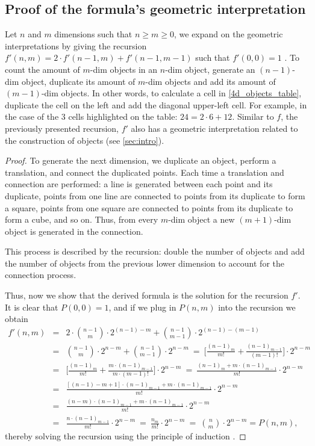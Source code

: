 \documentclass{article}
\begin{document}
	
	\subsection{Proof of the formula's geometric interpretation}
	
	Let $n$ and $m$ dimensions such that $n \geq m \geq 0$, we expand on the geometric interpretations by giving the recursion $f'(n,m) = 2 \cdot f'(n-1, m) + f'(n-1, m-1)$ such that $f'(0,0) = 1$ \cite{coxeter1973regular}. To count the amount of $m$-dim objects in an $n$-dim object, generate an $(n-1)$-dim object, duplicate its amount of $m$-dim objects and add its amount of $(m-1)$-dim objects. In other words, to calculate a cell in \autoref{4d_objects_table}, duplicate the cell on the left and add the diagonal upper-left cell. For example, in the case of the 3 cells highlighted on the table: $24 = 2 \cdot 6 + 12$. Similar to $f$, the previously presented recursion, $f'$ also has a geometric interpretation related to the construction of objects (see \autoref{sec:intro}).
	
	\begin{proof}
		To generate the next dimension, we duplicate an object, perform a translation, and connect the duplicated points. Each time a translation and connection are performed: a line is generated between each point and its duplicate, points from one line are connected to points from its duplicate to form a square, points from one square are connected to points from its duplicate to form a cube, and so on. Thus, from every $m$-dim object a new $(m+1)$-dim object is generated in the connection.
		
		This process is described by the recursion: double the number of objects and add the number of objects from the previous lower dimension to account for the connection process. 
		
		Thus, now we show that the derived formula is the solution for the recursion $f'$. It is clear that $P(0,0) = 1$, and if we plug in $P(n,m)$ into the recursion we obtain
		\begin{eqnarray*}
			f'(n,m) & = & 2 \cdot \binom{n-1}{m} \cdot 2^{(n-1)-m} + \binom{n-1}{m-1} \cdot 2^{(n-1)-(m-1)}\\
			& = & \binom{n-1}{m} \cdot 2^{n-m} + \binom{n-1}{m-1} \cdot 2^{n-m} \ = \ \Big[\frac{(n-1)_{m}}{m!} + \frac{(n-1)_{m-1}}{(m-1)!} \Big] \cdot 2^{n-m}\\
			& = & \Bigg[\frac{(n-1)_{m}}{m!} + \frac{m \cdot (n-1)_{m-1}}{m \cdot (m-1)!} \Bigg] \cdot 2^{n-m} \ = \ \frac{(n-1)_{m} + m \cdot (n-1)_{m-1}}{m!} \cdot 2^{n-m}\\
			& = & \frac{[(n-1) - m + 1] \cdot (n-1)_{m-1} + m \cdot (n-1)_{m-1}}{m!} \cdot 2^{n-m}\\
			& = & \frac{(n- m) \cdot (n-1)_{m-1} + m \cdot (n-1)_{m-1}}{m!} \cdot 2^{n-m}\\
			& = & \frac{n \cdot (n-1)_{m-1}}{m!} \cdot 2^{n-m} \ = \ \frac{n_{m}}{m!} \cdot 2^{n-m} \ = \ \binom{n}{m}\cdot2^{n-m} = P(n,m),
		\end{eqnarray*}
		thereby solving the recursion using the principle of induction \cite{rosen2011discrete}.
	\end{proof}
\end{document}
